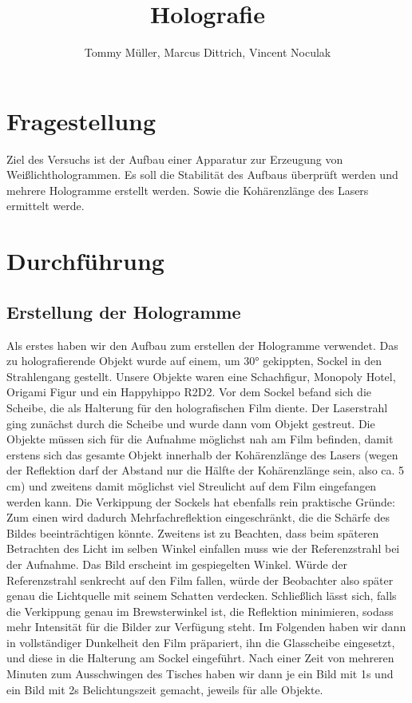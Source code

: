 \documentclass[10pt,a4paper]{article}
\author{Tommy Müller, Marcus Dittrich, Vincent Noculak}
\title{Holografie}
\begin{document}
\section{Fragestellung}

Ziel des Versuchs ist der Aufbau einer Apparatur zur Erzeugung von Weißlichthologrammen. Es soll die Stabilität des Aufbaus überprüft werden und mehrere Hologramme erstellt werden. Sowie die Kohärenzlänge des Lasers ermittelt werde.

\section{Durchführung}


\subsection{Erstellung der Hologramme}

Als erstes haben wir den Aufbau zum erstellen der Hologramme verwendet. Das zu holografierende Objekt wurde auf einem, um 30° gekippten, Sockel in den Strahlengang gestellt. Unsere Objekte waren eine Schachfigur, Monopoly Hotel, Origami Figur und ein Happyhippo R2D2. Vor dem Sockel befand sich die Scheibe, die als Halterung für den holografischen Film diente. 
Der Laserstrahl ging zunächst durch die Scheibe und wurde dann vom Objekt gestreut. Die Objekte müssen sich für die Aufnahme möglichst nah am Film beﬁnden, damit erstens sich das gesamte Objekt innerhalb der Kohärenzlänge des Lasers (wegen der Reﬂektion darf der Abstand nur die Hälfte der Kohärenzlänge sein, also ca. 5 cm) und zweitens damit möglichst viel Streulicht auf dem Film eingefangen werden kann. Die Verkippung der Sockels hat ebenfalls rein praktische Gründe: Zum einen wird dadurch Mehrfachreﬂektion eingeschränkt, die die Schärfe des Bildes beeinträchtigen könnte. Zweitens ist zu Beachten, dass beim späteren Betrachten des Licht im selben Winkel einfallen muss wie der Referenzstrahl bei der Aufnahme. Das Bild erscheint im gespiegelten Winkel. Würde der Referenzstrahl senkrecht auf den Film fallen, würde der Beobachter also später genau die Lichtquelle mit seinem Schatten verdecken. Schließlich lässt sich, falls die Verkippung genau im Brewsterwinkel ist, die Reﬂektion minimieren, sodass mehr Intensität für die Bilder zur Verfügung steht. Im Folgenden haben wir dann in vollständiger Dunkelheit den Film präpariert, ihn die Glasscheibe eingesetzt, und diese in die Halterung am Sockel eingeführt. Nach einer Zeit von mehreren Minuten zum Ausschwingen des Tisches haben wir dann je ein Bild mit 1s und ein Bild mit 2s Belichtungszeit gemacht, jeweils für alle Objekte.
\end{document}
